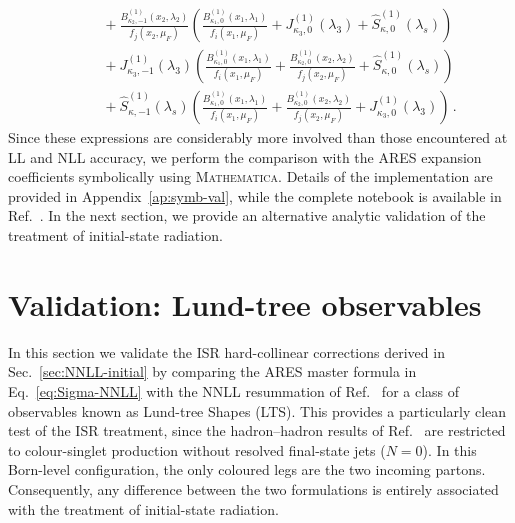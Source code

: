 \begin{equation}
\begin{aligned}
    &\qquad +\frac{B_{\kappa_2,-1}^{(1)}(x_2,\lambda_2)}{f_j(x_2,\mu_F)}\left(\frac{B_{\kappa_1,0}^{(1)}(x_1,\lambda_1)}{f_i(x_1,\mu_F)}+J_{\kappa_3,0}^{(1)}(\lambda_3)
    +\widehat{S}^{(1)}_{\kappa,0}(\lambda_s)\right)\\[0.5ex]
    &\qquad +J_{\kappa_3,-1}^{(1)}(\lambda_3)\left(\frac{B_{\kappa_1,0}^{(1)}(x_1,\lambda_1)}{f_i(x_1,\mu_F)}+\frac{B_{\kappa_2,0}^{(1)}(x_2,\lambda_2)}{f_j(x_2,\mu_F)}+\widehat{S}^{(1)}_{\kappa,0}(\lambda_s)\right)\\[0.5ex]
    &\qquad +\widehat{S}^{(1)}_{\kappa,-1}(\lambda_s)\left(\frac{B_{\kappa_1,0}^{(1)}(x_1,\lambda_1)}{f_i(x_1,\mu_F)}+\frac{B_{\kappa_2,0}^{(1)}(x_2,\lambda_2)}{f_j(x_2,\mu_F)}+J_{\kappa_3,0}^{(1)}(\lambda_3)\right)\,.
\end{aligned}
\end{equation}
Since these expressions are
considerably more involved than those encountered at LL and NLL
accuracy, we perform the comparison with the \textsc{ARES} expansion
coefficients symbolically using \textsc{Mathematica}. Details of the
implementation are provided in Appendix~\ref{ap:symb-val}, while the
complete notebook is available in Ref.~\cite{peake2026validation}.
In the next section, we provide an alternative analytic validation of
the treatment of initial-state radiation.

\section{Validation: Lund-tree observables}
\label{sec:LTS-val}

In this section we validate the ISR hard-collinear corrections derived in
Sec.~\ref{sec:NNLL-initial} by comparing the \textsc{ARES} master formula in
Eq.~\eqref{eq:Sigma-NNLL} with the NNLL resummation of Ref.~\cite{vanBeekveld:2025zjh} for a class
of observables known as Lund-tree Shapes (LTS). This provides
a particularly clean test of the ISR treatment, since the hadron--hadron
results of Ref.~\cite{vanBeekveld:2025zjh} are restricted to colour-singlet
production without resolved final-state jets ($N=0$). In this Born-level configuration, 
the only coloured legs are the two incoming partons. Consequently, any
difference between the two formulations is entirely associated with the
treatment of initial-state radiation.

